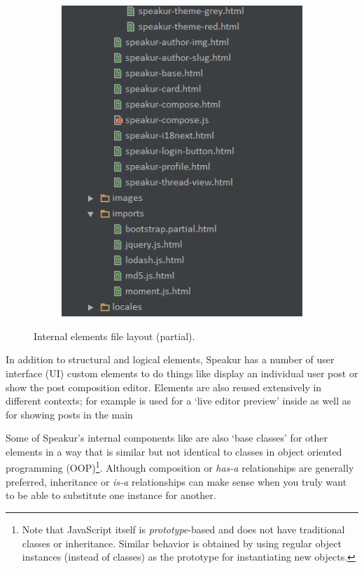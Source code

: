 \begin{figure}[htb]
{\begin{subfigure}[b]{0.48\textwidth}
		\includegraphics[width=\textwidth]{images/file_layout_b.png}
	\end{subfigure} %
	}
	\caption{Internal elements file layout (partial).}
	\label{f:file_layout}
\end{figure}

In addition to structural and logical elements, 
Speakur has a number of user interface (UI) custom elements to do things like display an individual user post or show the post composition editor.
Elements are also reused extensively in different contexts; 
for example  is used for a `live editor preview' inside  as well as for showing posts in the main 

Some of Speakur's internal components like  are also `base classes' for other elements
in a way that is similar but not identical to classes in object oriented programming (OOP)\footnote{Note that JavaScript itself is \textit{prototype}-based and does not have traditional classes or inheritance. 
Similar behavior is obtained by using regular object instances (instead of classes) as the prototype for instantiating new objects.}. 
Although composition or \textit{has-a} relationships are generally preferred, inheritance or \textit{is-a} relationships can make sense when you truly want to be able to substitute one instance for another.


